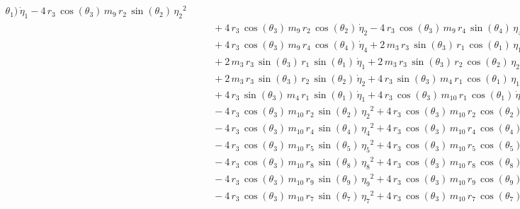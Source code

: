 \begin{eqnarray*}
{\theta_{1}})\,{\dot{\eta}_{1}} - 4\,r_{3}\,\cos({\theta_{3}})\,m_{9}
\,r_{2}\,\sin({\theta_{2}})\,{{\eta_{2}}}^2 \\ &&\quad\mbox{} + 4\,r_{
3}\,\cos({\theta_{3}})\,m_{9}\,r_{2}\,\cos({\theta_{2}})\,{\dot{\eta}
_{2}} - 4\,r_{3}\,\cos({\theta_{3}})\,m_{9}\,r_{4}\,\sin({\theta_{4}})
\,{{\eta_{4}}}^2 \\ &&\quad\mbox{} + 4\,r_{3}\,\cos({\theta_{3}})\,m_{
9}\,r_{4}\,\cos({\theta_{4}})\,{\dot{\eta}_{4}} + 2\,m_{3}\,r_{3}\,
\sin({\theta_{3}})\,r_{1}\,\cos({\theta_{1}})\,{{\eta_{1}}}^2
 \\ &&\quad\mbox{} + 2\,m_{3}\,r_{3}\,\sin({\theta_{3}})\,r_{1}\,\sin(
{\theta_{1}})\,{\dot{\eta}_{1}} + 2\,m_{3}\,r_{3}\,\sin({\theta_{3}})
\,r_{2}\,\cos({\theta_{2}})\,{{\eta_{2}}}^2 \\ &&\quad\mbox{} + 2\,m_{
3}\,r_{3}\,\sin({\theta_{3}})\,r_{2}\,\sin({\theta_{2}})\,{\dot{\eta}
_{2}} + 4\,r_{3}\,\sin({\theta_{3}})\,m_{4}\,r_{1}\,\cos({\theta_{1}})
\,{{\eta_{1}}}^2 \\ &&\quad\mbox{} + 4\,r_{3}\,\sin({\theta_{3}})\,m_{
4}\,r_{1}\,\sin({\theta_{1}})\,{\dot{\eta}_{1}} + 4\,r_{3}\,\cos({
\theta_{3}})\,m_{10}\,r_{1}\,\cos({\theta_{1}})\,{\dot{\eta}_{1}}
 \\ &&\quad\mbox{} - 4\,r_{3}\,\cos({\theta_{3}})\,m_{10}\,r_{2}\,\sin
({\theta_{2}})\,{{\eta_{2}}}^2 + 4\,r_{3}\,\cos({\theta_{3}})\,m_{10}
\,r_{2}\,\cos({\theta_{2}})\,{\dot{\eta}_{2}} \\ &&\quad\mbox{} - 4\,r
_{3}\,\cos({\theta_{3}})\,m_{10}\,r_{4}\,\sin({\theta_{4}})\,{{\eta_{4
}}}^2 + 4\,r_{3}\,\cos({\theta_{3}})\,m_{10}\,r_{4}\,\cos({\theta_{4}}
)\,{\dot{\eta}_{4}} \\ &&\quad\mbox{} - 4\,r_{3}\,\cos({\theta_{3}})\,
m_{10}\,r_{5}\,\sin({\theta_{5}})\,{{\eta_{5}}}^2 + 4\,r_{3}\,\cos({
\theta_{3}})\,m_{10}\,r_{5}\,\cos({\theta_{5}})\,{\dot{\eta}_{5}}
 \\ &&\quad\mbox{} - 4\,r_{3}\,\cos({\theta_{3}})\,m_{10}\,r_{8}\,\sin
({\theta_{8}})\,{{\eta_{8}}}^2 + 4\,r_{3}\,\cos({\theta_{3}})\,m_{10}
\,r_{8}\,\cos({\theta_{8}})\,{\dot{\eta}_{8}} \\ &&\quad\mbox{} - 4\,r
_{3}\,\cos({\theta_{3}})\,m_{10}\,r_{9}\,\sin({\theta_{9}})\,{{\eta_{9
}}}^2 + 4\,r_{3}\,\cos({\theta_{3}})\,m_{10}\,r_{9}\,\cos({\theta_{9}}
)\,{\dot{\eta}_{9}} \\ &&\quad\mbox{} - 4\,r_{3}\,\cos({\theta_{3}})\,
m_{10}\,r_{7}\,\sin({\theta_{7}})\,{{\eta_{7}}}^2 + 4\,r_{3}\,\cos({
\theta_{3}})\,m_{10}\,r_{7}\,\cos({\theta_{7}})\,{\dot{\eta}_{7}}

\end{eqnarray*}
